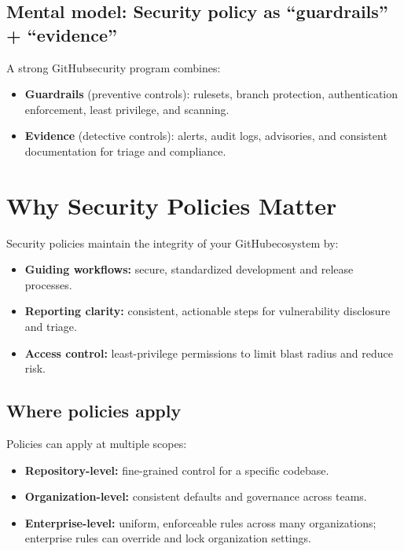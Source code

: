 \documentclass[11pt]{article}
\newcommand{\gh}{\textsf{GitHub}}
\begin{document}
\subsection{Mental model: Security policy as ``guardrails'' + ``evidence''}
A strong \gh security program combines:

\begin{itemize}[leftmargin=*,itemsep=2pt]
  \item \textbf{Guardrails} (preventive controls): rulesets, branch protection, authentication enforcement, least privilege, and scanning.
  \item \textbf{Evidence} (detective controls): alerts, audit logs, advisories, and consistent documentation for triage and compliance.
\end{itemize}

\section{Why Security Policies Matter}

Security policies maintain the integrity of your \gh ecosystem by:

\begin{itemize}[leftmargin=*,itemsep=2pt]
  \item \textbf{Guiding workflows:} secure, standardized development and release processes.
  \item \textbf{Reporting clarity:} consistent, actionable steps for vulnerability disclosure and triage.
  \item \textbf{Access control:} least-privilege permissions to limit blast radius and reduce risk.
\end{itemize}

\subsection{Where policies apply}
Policies can apply at multiple scopes:

\begin{itemize}[leftmargin=*,itemsep=2pt]
  \item \textbf{Repository-level:} fine-grained control for a specific codebase.
  \item \textbf{Organization-level:} consistent defaults and governance across teams.
  \item \textbf{Enterprise-level:} uniform, enforceable rules across many organizations; enterprise rules can override and lock organization settings.
\end{itemize}
\end{document}
